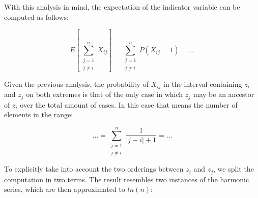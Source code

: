 \documentclass[a4paper]{article}
\begin{document}
With this analysis in mind, the expectation of the indicator variable can
be computed as follows:

\[E[\sum\limits_{\substack{j = 1\\j \ne i}}^{n} X_{ij}] = \sum\limits_{\substack{j = 1 \\j \ne i}}^{n} P(X_{ij} = 1) = ...\]

Given the previous analysis, the probability of \(X_{ij}\) in the
interval containing \(z_i\) and \(z_j\) on both extremes is that of the
only case in which \(z_j\) may be an ancestor of \(z_i\) over the total
amount of cases. In this case that means the number of elements in the
range:

\[... = \sum\limits_{\substack{j = 1\\j \ne i}}^{n} \frac{1}{|j - i| + 1} = ...\]

To explicitly take into account the two orderings between \(z_i\) and
\(z_j\), we split the computation in two terms. The result resembles two
instances of the harmonic series, which are then approximated to
\(ln(n)\):
\end{document}
